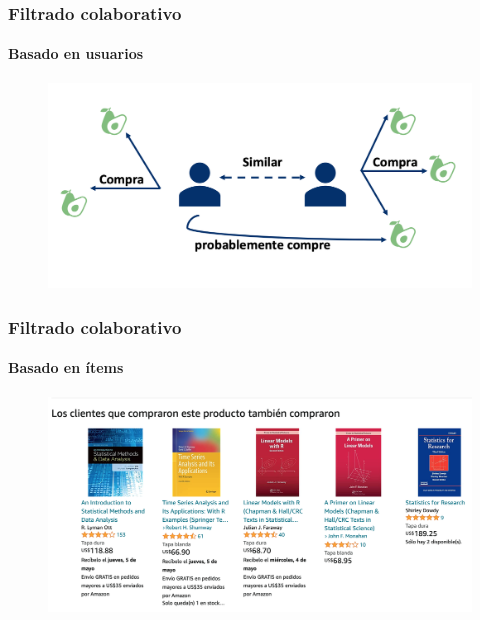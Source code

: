 \documentclass[
  shownotes,
  xcolor={svgnames},
  hyperref={colorlinks,citecolor=DarkBlue,linkcolor=Black,urlcolor=DarkBlue}
  , aspectratio=169]{beamer}
\begin{document}
\begin{frame}
\frametitle{Filtrado colaborativo}
\framesubtitle{Basado en usuarios}

\begin{figure}[H]
\centering

  \includegraphics[scale=0.5]{../figs/aguacate.png}
\end{figure}



\end{frame}    
\begin{frame}
\frametitle{Filtrado colaborativo}
\framesubtitle{Basado en ítems}

\begin{figure}[H]
\centering

  \includegraphics[scale=0.35]{../figs/usuario_libros.png}
\end{figure}


\end{frame}    
\end{document}
